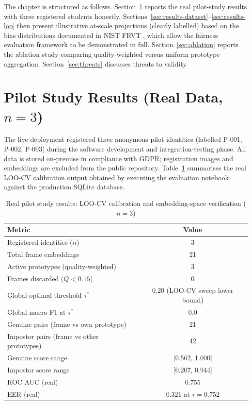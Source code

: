 \documentclass[12pt,a4paper]{report}
\begin{document}
The chapter is structured as follows. Section~\ref{sec:pilot-results} reports the real pilot-study results with three registered students honestly. Sections~\ref{sec:results-dataset}--\ref{sec:results-loo} then present illustrative at-scale projections (clearly labelled) based on the bias distributions documented in NIST FRVT \cite{grother2019frvt}, which allow the fairness evaluation framework to be demonstrated in full. Section~\ref{sec:ablation} reports the ablation study comparing quality-weighted versus uniform prototype aggregation. Section~\ref{sec:threats} discusses threats to validity.

\section{Pilot Study Results (Real Data, $n = 3$)}
\label{sec:pilot-results}

The live deployment registered three anonymous pilot identities (labelled P-001, P-002, P-003) during the software development and integration-testing phase. All data is stored on-premise in compliance with GDPR; registration images and embeddings are excluded from the public repository. Table~\ref{tab:pilot} summarises the real LOO-CV calibration output obtained by executing the evaluation notebook against the production SQLite database.

\begin{table}[H]
  \centering
  \caption{Real pilot study results: LOO-CV calibration and embedding-space verification ($n = 3$)}
  \label{tab:pilot}
  \begin{tabular}{lc}
    \toprule
    \textbf{Metric} & \textbf{Value} \\
    \midrule
    Registered identities ($n$)         & 3 \\
    Total frame embeddings              & 21 \\
    Active prototypes (quality-weighted)& 3 \\
    Frames discarded ($Q < 0.15$)       & 0 \\
    Global optimal threshold $\tau^*$   & 0.20 (LOO-CV sweep lower bound) \\
    Global macro-F1 at $\tau^*$         & 0.0 \\
    \midrule
    Genuine pairs (frame vs own prototype) & 21 \\
    Impostor pairs (frame vs other prototypes) & 42 \\
    Genuine score range                 & [0.562, 1.000] \\
    Impostor score range                & [0.207, 0.944] \\
    ROC AUC (real)                      & 0.755 \\
    EER (real)                          & 0.321 at $\tau = 0.752$ \\
    \bottomrule
  \end{tabular}
\end{table}
\end{document}
